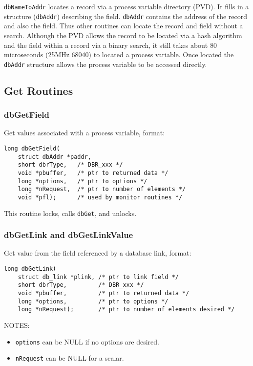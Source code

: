 \verb|dbNameToAddr| locates a record via a process variable directory (PVD).
It fills in a structure (\verb|dbAddr|) describing the field.
\verb|dbAddr| contains the address of the record and also the field.
Thus other routines can locate the record and field without a search.
Although the PVD allows the record to be located via a hash algorithm and the field within a record via a binary search, it still takes about 80 microseconds (25MHz 68040) to located a process variable.
Once located the \verb|dbAddr| structure allows the process variable to be accessed directly.

\subsection{Get Routines}

\subsubsection{dbGetField}

Get values associated with a process variable, format:

\begin{verbatim}
long dbGetField(
    struct dbAddr *paddr,
    short dbrType,   /* DBR_xxx */
    void *pbuffer,   /* ptr to returned data */
    long *options,   /* ptr to options */
    long *nRequest,  /* ptr to number of elements */
    void *pfl);      /* used by monitor routines */
\end{verbatim}

This routine locks, calls \verb|dbGet|, and unlocks.

\subsubsection{dbGetLink and dbGetLinkValue}

Get value from the field referenced by a database link, format:

\begin{verbatim}
long dbGetLink(
    struct db_link *plink, /* ptr to link field */
    short dbrType,         /* DBR_xxx */
    void *pbuffer,         /* ptr to returned data */
    long *options,         /* ptr to options */
    long *nRequest);       /* ptr to number of elements desired */
\end{verbatim}

NOTES:

\begin{itemize}

\item \verb|options| can be NULL if no options are desired.

\item \verb|nRequest| can be NULL for a scalar.

\end{itemize}


